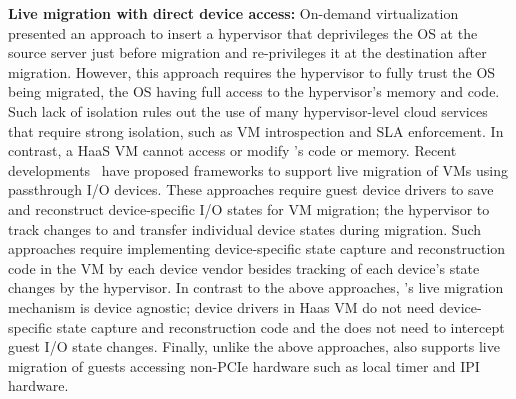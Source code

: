{\bf Live migration with direct device access:} 
On-demand virtualization~\cite{ondemand} presented an approach
to insert a hypervisor that deprivileges the OS at the 
source server just before migration and re-privileges it
at the destination after migration. However, this approach 
requires the hypervisor to fully trust the OS being migrated, 
the OS having full access to the hypervisor's memory and code.
Such lack of isolation rules out the use of many hypervisor-level
cloud services that require strong isolation, such as VM introspection
and SLA enforcement. In contrast, a HaaS VM 
cannot access or modify \sna's code or memory.
Recent developments~\cite{vfio-live-migration,blmvisor-journal} 
have proposed frameworks to support live migration 
of VMs using passthrough I/O devices. These approaches 
require guest device drivers to save and reconstruct device-specific 
I/O states for VM migration; the hypervisor to track changes to
and transfer individual device states during migration.
Such approaches require
implementing device-specific state capture and reconstruction code 
in the VM by each device vendor besides tracking of each device's
state changes by the hypervisor. 
In contrast to the above approaches, 
\sna's live migration mechanism is device agnostic; 
device drivers in Haas VM do not need
device-specific state capture and reconstruction code 
and the \na does not need to intercept guest I/O state changes.
Finally, unlike the above approaches,
\na also supports live migration of guests accessing non-PCIe 
hardware such as local timer and IPI hardware.


